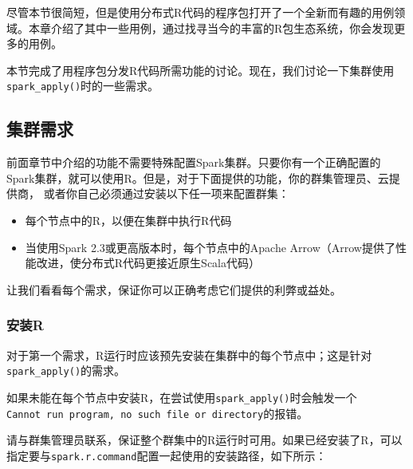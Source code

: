 \documentclass[
]{article}
\newenvironment{Shaded}{\begin{snugshade}}{\end{snugshade}}
\newcommand{\ControlFlowTok}[1]{\textcolor[rgb]{0.13,0.29,0.53}{\textbf{#1}}}
\newcommand{\DataTypeTok}[1]{\textcolor[rgb]{0.13,0.29,0.53}{#1}}
\newcommand{\DecValTok}[1]{\textcolor[rgb]{0.00,0.00,0.81}{#1}}
\newcommand{\KeywordTok}[1]{\textcolor[rgb]{0.13,0.29,0.53}{\textbf{#1}}}
\newcommand{\NormalTok}[1]{#1}
\newcommand{\OperatorTok}[1]{\textcolor[rgb]{0.81,0.36,0.00}{\textbf{#1}}}
\newcommand{\StringTok}[1]{\textcolor[rgb]{0.31,0.60,0.02}{#1}}
\providecommand{\tightlist}{%
  \setlength{\itemsep}{0pt}\setlength{\parskip}{0pt}}
\begin{document}
尽管本节很简短，但是使用分布式R代码的程序包打开了一个全新而有趣的用例领域。本章介绍了其中一些用例，通过找寻当今的丰富的R包生态系统，你会发现更多的用例。

本节完成了用程序包分发R代码所需功能的讨论。现在，我们讨论一下集群使用\texttt{spark\_apply()}时的一些需求。

\hypertarget{ux96c6ux7fa4ux9700ux6c42}{%
\subsection{集群需求}\label{ux96c6ux7fa4ux9700ux6c42}}

前面章节中介绍的功能不需要特殊配置Spark集群。只要你有一个正确配置的Spark集群，就可以使用R。但是，对于下面提供的功能，你的群集管理员、云提供商，
或者你自己必须通过安装以下任一项来配置群集：

\begin{itemize}
\tightlist
\item
  每个节点中的R，以便在集群中执行R代码
\item
  当使用Spark 2.3或更高版本时，每个节点中的Apache
  Arrow（Arrow提供了性能改进，使分布式R代码更接近原生Scala代码）
\end{itemize}

让我们看看每个需求，保证你可以正确考虑它们提供的利弊或益处。

\hypertarget{ux5b89ux88c5r}{%
\subsubsection{安装R}\label{ux5b89ux88c5r}}

对于第一个需求，R运行时应该预先安装在集群中的每个节点中；这是针对\texttt{spark\_apply()}的需求。

如果未能在每个节点中安装R，在尝试使用\texttt{spark\_apply()}时会触发一个\texttt{Cannot\ run\ program,\ no\ such\ file\ or\ directory}的报错。

请与群集管理员联系，保证整个群集中的R运行时可用。如果已经安装了R，可以指定要与\texttt{spark.r.command}配置一起使用的安装路径，如下所示：

\begin{Shaded}
\end{Shaded}
\end{document}
